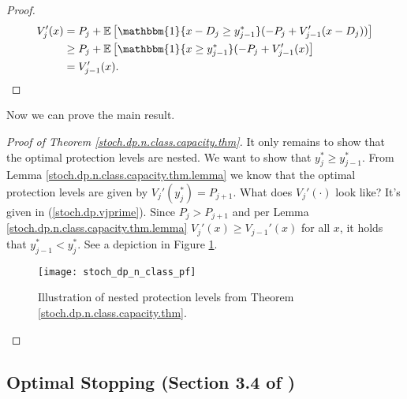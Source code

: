 \begin{proof}
\begin{align*}
V_j'(x) & = P_j +  \E \left[ \mathbbm{1} \{x - D_j \geq  y_{j-1}^*\}  (-P_j + V_{j-1}'(x - D_j))\right] \\
& \geq P_j + \E\left[  \mathbbm{1}\{x \geq y_{j-1}^*\}(- P_j + V_{j-1}'(x) \right] 
\\ & = V_{j-1}'(x).
\end{align*}


\end{proof}

Now we can prove the main result.

\begin{proof}[Proof of Theorem \ref{stoch.dp.n.class.capacity.thm}]

It only remains to show that the optimal protection levels are nested. We want to show that \(y_j^* \geq y_{j-1}^*\). From Lemma \ref{stoch.dp.n.class.capacity.thm.lemma} we know that the optimal protection levels are given by \(V_j'(y_j^*) = P_{j+1}\). What does \(V_j'(\cdot)\) look like? It's given in (\ref{stoch.dp.vjprime}). Since \(P_{j} > P_{j+1}\) and per Lemma \ref{stoch.dp.n.class.capacity.thm.lemma} \(V_j'(x) \geq V_{j-1}'(x)\) for all \(x\), it holds that \(y_{j-1}^* < y_j^*\).  See a depiction in Figure \ref{stoch_dp_n_class_pf_fig}.

\begin{figure}[htbp]
\begin{center}
\texttt{[image: stoch\_dp\_n\_class\_pf]}
\caption{Illustration of nested protection levels from Theorem \ref{stoch.dp.n.class.capacity.thm}.}
\label{stoch_dp_n_class_pf_fig}
\end{center}
\end{figure}



\end{proof}

\subsection{Optimal Stopping (Section 3.4 of \citet{v1_bertsekas2012dynamic})}

